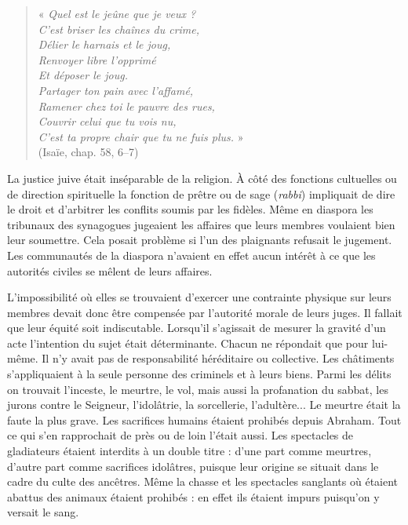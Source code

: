 \begin{verse}
 « \emph{Quel est le jeûne que je veux ? \\
 C'est briser les chaînes du crime, \\
 Délier le harnais et le joug, \\
 Renvoyer libre l'opprimé \\
 Et déposer le joug. \\
 Partager ton pain avec l'affamé, \\
 Ramener chez toi le pauvre des rues, \\
 Couvrir celui que tu vois nu, \\
 C'est ta propre chair que tu ne fuis plus.} » \\
 (Isaïe, chap. 58, 6--7)
\end{verse}



 La justice juive était inséparable de la religion. À côté des fonctions cultuelles ou de direction spirituelle la fonction de prêtre ou de sage (\emph{rabbi}) impliquait de dire le droit et d'arbitrer les conflits soumis par les fidèles. Même en diaspora les tribunaux des synagogues jugeaient les affaires que leurs membres voulaient bien leur soumettre. Cela posait problème si l'un des plaignants refusait le jugement. Les communautés de la diaspora n'avaient en effet aucun intérêt à ce que les autorités civiles se mêlent de leurs affaires. 
 
 L'impossibilité où elles se trouvaient d'exercer une contrainte physique sur leurs membres devait donc être compensée par l'autorité morale de leurs juges. Il fallait que leur équité soit indiscutable. Lorsqu'il s'agissait de mesurer la gravité d'un acte l'intention du sujet était déterminante. Chacun ne répondait que pour lui-même. Il n'y avait pas de responsabilité héréditaire ou collective. Les châtiments s'appliquaient à la seule personne des criminels et à leurs biens. Parmi les délits on trouvait l'inceste, le meurtre, le vol, mais aussi la profanation du sabbat, les jurons contre le Seigneur, l'idolâtrie, la sorcellerie, l'adultère... Le meurtre était la faute la plus grave. Les sacrifices humains étaient prohibés depuis Abraham. Tout ce qui s'en rapprochait de près ou de loin l'était aussi. Les spectacles de gladiateurs étaient interdits à un double titre : d'une part comme meurtres, d'autre part comme sacrifices idolâtres, puisque leur origine se situait dans le cadre du culte des ancêtres. Même la chasse et les spectacles sanglants où étaient abattus des animaux étaient prohibés : en effet ils étaient impurs puisqu'on y versait le sang. 

